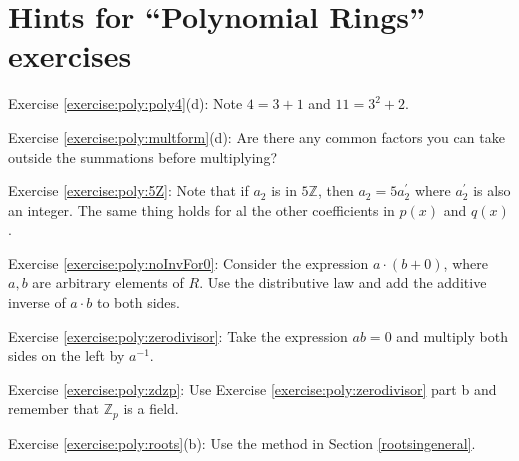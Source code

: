 \section{Hints for ``Polynomial Rings'' exercises}\label{sec:polyrings:hints} 

\noindent Exercise \ref{exercise:poly:poly4}(d):  Note $4=3+1$ and $11=3^2+2$.

\noindent Exercise \ref{exercise:poly:multform}(d): Are there any common factors you can take outside 
the summations before multiplying?

\noindent Exercise \ref{exercise:poly:5Z}:  Note that if  $a_2$ is in $5\mathbb{Z}$, then $a_2 = 5a_2^{\prime}$ where $a_2^{\prime}$ is also an integer.
The same thing holds for al the other coefficients in $p(x)$ and $q(x)$.

\noindent Exercise \ref{exercise:poly:noInvFor0}:  Consider the expression $a\cdot (b + 0)$, where $a,b$ are arbitrary elements of $R$. Use the distributive law and add the additive inverse of  $a \cdot b$ to both sides.

\noindent Exercise \ref{exercise:poly:zerodivisor}:  Take the expression $ab=0$ and multiply both sides on the left by $a^{-1}$.

\noindent Exercise \ref{exercise:poly:zdzp}:  Use Exercise \ref{exercise:poly:zerodivisor} part b and remember that $\mathbb{Z}_p$ is a field.

\noindent Exercise \ref{exercise:poly:roots}(b):  Use the method in Section \ref{rootsingeneral}.
 